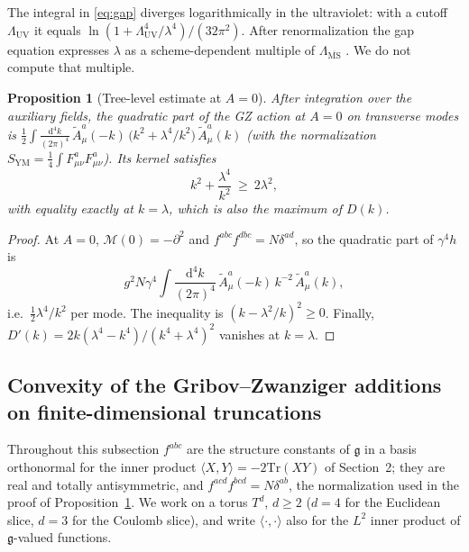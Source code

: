 \documentclass[11pt,a4paper]{amsart}
\newtheorem{proposition}[theorem]{Proposition}
\theoremstyle{definition}
\newcommand{\Tr}{\mathrm{Tr}}
\newcommand{\diff}{\mathrm{d}}
\newcommand{\MSbar}{\overline{\mathrm{MS}}}
\begin{document}
The integral in \eqref{eq:gap} diverges logarithmically in the ultraviolet: with a cutoff $\Lambda_{\mathrm{UV}}$ it equals $\ln(1 + \Lambda_{\mathrm{UV}}^4/\lambda^4)/(32\pi^2)$. After renormalization the gap equation expresses $\lambda$ as a scheme-dependent multiple of $\Lambda_{\MSbar}$ \cite{vandersickel2012gribov}. We do not compute that multiple.

\begin{proposition}[Tree-level estimate at $A=0$]
\label{prop:amgm_tree}
After integration over the auxiliary fields, the quadratic part of the GZ action at $A = 0$ on transverse modes is $\frac12\int \frac{\diff^4k}{(2\pi)^4}\, \tilde{A}^a_\mu(-k)\,\big(k^2 + \lambda^4/k^2\big)\,\tilde{A}^a_\mu(k)$ (with the normalization $S_{\mathrm{YM}} = \frac{1}{4}\int F^a_{\mu\nu}F^a_{\mu\nu}$). Its kernel satisfies
\begin{equation}
    k^2 + \frac{\lambda^4}{k^2} \ \ge\ 2\lambda^2 ,
\end{equation}
with equality exactly at $k = \lambda$, which is also the maximum of $D(k)$.
\end{proposition}

\begin{proof}
At $A = 0$, $\mathcal{M}(0) = -\partial^2$ and $f^{abc}f^{dbc} = N\delta^{ad}$, so the quadratic part of $\gamma^4 h$ is
\begin{equation*}
    g^2N\gamma^4\int \frac{\diff^4k}{(2\pi)^4}\, \tilde A^a_\mu(-k)\,k^{-2}\,\tilde A^a_\mu(k),
\end{equation*}
i.e.\ $\frac12\lambda^4/k^2$ per mode. The inequality is $(k - \lambda^2/k)^2 \ge 0$. Finally, $D'(k) = 2k(\lambda^4 - k^4)/(k^4+\lambda^4)^2$ vanishes at $k = \lambda$.
\end{proof}

\subsection*{Convexity of the Gribov--Zwanziger additions on finite-dimensional truncations}
Throughout this subsection $f^{abc}$ are the structure constants of $\mathfrak{g}$ in a basis orthonormal for the inner product $\langle X,Y\rangle = -2\Tr(XY)$ of Section~2; they are real and totally antisymmetric, and $f^{acd}f^{bcd} = N\delta^{ab}$, the normalization used in the proof of Proposition~\ref{prop:amgm_tree}. We work on a torus $T^d$, $d \ge 2$ ($d = 4$ for the Euclidean slice, $d = 3$ for the Coulomb slice), and write $\langle\cdot,\cdot\rangle$ also for the $L^2$ inner product of $\mathfrak{g}$-valued functions.
\end{document}

